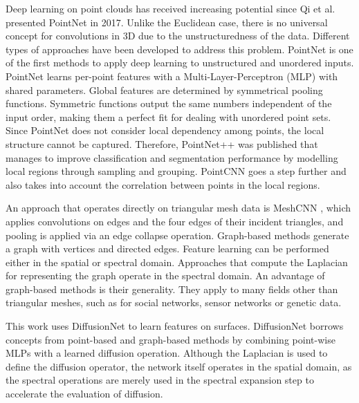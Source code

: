 \documentclass[class=article, crop=false]{standalone}
\begin{document}
Deep learning on point clouds has received increasing potential since Qi et al. presented PointNet \cite{Qi2017} in 2017. %
Unlike the Euclidean case, there is no universal concept for convolutions in 3D due to the unstructuredness of the data. Different types of approaches have been developed to address this problem.
PointNet is one of the first methods to apply deep learning to unstructured and unordered inputs. PointNet learns per-point features with a Multi-Layer-Perceptron (MLP) with shared parameters. Global features are determined by symmetrical pooling functions. Symmetric functions output the same numbers independent of the input order, making them a perfect fit for dealing with unordered point sets.
Since PointNet does not consider local dependency among points, the local structure cannot be captured. Therefore, PointNet++ \cite{Qi2017b} was published that manages to improve classification and segmentation performance by modelling local regions through sampling and grouping. PointCNN \cite{Li2018} goes a step further and also takes into account the correlation between points in the local regions.

An approach that operates directly on triangular mesh data is MeshCNN \cite{Hanocka2019}, which applies convolutions on edges and the four edges of their incident triangles, and pooling is applied via an edge collapse operation.
Graph-based methods generate a graph with vertices and directed edges. Feature learning can be performed either in the spatial or spectral domain. Approaches that compute the Laplacian for representing the graph operate in the spectral domain. An advantage of graph-based methods is their generality. They apply to many fields other than triangular meshes, such as for social networks, sensor networks or genetic data.

This work uses DiffusionNet \cite{sharp2022diffusionnet} to learn features on surfaces. DiffusionNet borrows concepts from point-based and graph-based methods by combining point-wise MLPs with a learned diffusion operation. Although the Laplacian is used to define the diffusion operator, the network itself operates in the spatial domain, as the spectral operations are merely used in the spectral expansion step to accelerate the evaluation of diffusion.



\end{document}
